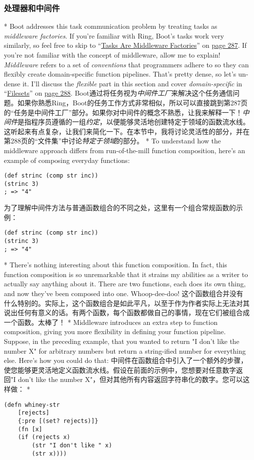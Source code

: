 \begin{paracol}{2}
\subsubsection{处理器和中间件}
\switchcolumn[0]*
Boot addresses this task communication problem by treating tasks as
\emph{middleware factories}. If you're familiar with Ring, Boot's tasks
work very similarly, so feel free to skip to
``\href{javascript:void(0)}{Tasks Are Middleware Factories}'' on
\href{javascript:void(0)}{page 287}. If you're not familiar with the
concept of middleware, allow me to explain! \emph{Middleware} refers to
a set of \emph{conventions} that programmers adhere to so they can
flexibly create domain-specific function pipelines. That's pretty dense,
so let's un-dense it. I'll discuss the \emph{flexible} part in this
section and cover \emph{domain-specific} in
``\href{javascript:void(0)}{Filesets}'' on
\href{javascript:void(0)}{page 288}.
\switchcolumn
Boot通过将任务视为\emph{中间件工厂}来解决这个任务通信问题。如果你熟悉Ring，Boot的任务工作方式非常相似，所以可以直接跳到第287页的``任务是中间件工厂''部分。如果你对中间件的概念不熟悉，让我来解释一下！\emph{中间件}是指程序员遵循的一组\emph{约定}，以便能够灵活地创建特定于领域的函数流水线。这听起来有点复杂，让我们来简化一下。在本节中，我将讨论灵活性的部分，并在第288页的``文件集''中讨论\emph{特定于领域}的部分。
\switchcolumn[0]*
To understand how the middleware approach differs from run-of-the-mill
function composition, here's an example of composing everyday functions:
\begin{verbatim}
(def strinc (comp str inc))
(strinc 3)
; => "4"
\end{verbatim}
\switchcolumn
为了理解中间件方法与普通函数组合的不同之处，这里有一个组合常规函数的示例：
\begin{verbatim}
(def strinc (comp str inc))
(strinc 3)
; => "4"
\end{verbatim}
\switchcolumn[0]*
There's nothing interesting about this function composition. In fact,
this function composition is so unremarkable that it strains my
abilities as a writer to actually say anything about it. There are two
functions, each does its own thing, and now they've been composed into
one. Whoop-dee-doo!
\switchcolumn
这个函数组合并没有什么特别的。实际上，这个函数组合是如此平凡，以至于作为作者实际上无法对其说出任何有意义的话。有两个函数，每个函数都做自己的事情，现在它们被组合成一个函数。太棒了！
\switchcolumn[0]*
Middleware introduces an extra step to function composition, giving you
more flexibility in defining your function pipeline. Suppose, in the
preceding example, that you wanted to return "I don't like the number X"
for arbitrary numbers but return a string-ified number for everything
else. Here's how you could do that:
\switchcolumn
中间件在函数组合中引入了一个额外的步骤，使您能够更灵活地定义函数流水线。假设在前面的示例中，您想要对任意数字返回"I don't like the number X"，但对其他所有内容返回字符串化的数字。您可以这样做：
\switchcolumn[0]*
\begin{verbatim}
(defn whiney-str
    [rejects]
    {:pre [(set? rejects)]}
    (fn [x]
    (if (rejects x)
        (str "I don't like " x)
        (str x))))


\end{verbatim}
\end{paracol}
